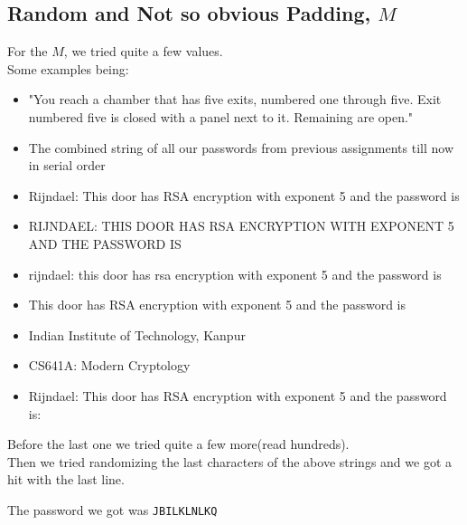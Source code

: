 \documentclass[11pt]{article}
\begin{document}
\subsection*{Random and Not so obvious Padding, $M$}
For the $M$, we tried quite a few values.\\
Some examples being:
\begin{itemize}
    \item "You reach a chamber that has five exits, numbered one through five. Exit numbered five is closed with a panel next to it. Remaining are open."
    \item The combined string of all our passwords from previous assignments till now in serial order
    \item Rijndael: This door has RSA encryption with exponent 5 and the password is
    \item RIJNDAEL: THIS DOOR HAS RSA ENCRYPTION WITH EXPONENT 5 AND THE PASSWORD IS
    \item rijndael: this door has rsa encryption with exponent 5 and the password is
    \item This door has RSA encryption with exponent 5 and the password is
    \item Indian Institute of Technology, Kanpur
    \item CS641A: Modern Cryptology
    \item Rijndael: This door has RSA encryption with exponent 5 and the password is:
\end{itemize}
Before the last one we tried quite a few more(read hundreds).\\
Then we tried randomizing the last characters of the above strings and we got a hit with the last line.

The password we got was \texttt{JBILKLNLKQ}




\end{document}
